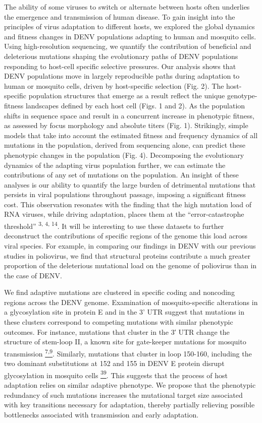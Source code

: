 \documentclass[
]{article}
\begin{document}
The ability of some viruses to switch or alternate between hosts often
underlies the emergence and transmission of human disease. To gain
insight into the principles of virus adaptation to different hosts, we
explored the global dynamics and fitness changes in DENV populations
adapting to human and mosquito cells. Using high-resolution sequencing,
we quantify the contribution of beneficial and deleterious mutations
shaping the evolutionary paths of DENV populations responding to
host-cell specific selective pressures. Our analysis shows that DENV
populations move in largely reproducible paths during adaptation to
human or mosquito cells, driven by host-specific selection (Fig. 2). The
host-specific population structures that emerge as a result reflect the
unique genotype-fitness landscapes defined by each host cell (Figs. 1
and 2). As the population shifts in sequence space and result in a
concurrent increase in phenotypic fitness, as assessed by focus
morphology and absolute titers (Fig. 1). Strikingly, simple models that
take into account the estimated fitness and frequency dynamics of all
mutations in the population, derived from sequencing alone, can predict
these phenotypic changes in the population (Fig. 4). Decomposing the
evolutionary dynamics of the adapting virus population further, we can
estimate the contributions of any set of mutations on the population. An
insight of these analyses is our ability to quantify the large burden of
detrimental mutations that persists in viral populations throughout
passage, imposing a significant fitness cost. This observation resonates
with the finding that the high mutation load of RNA viruses, while
driving adaptation, places them at the ``error-catastrophe threshold''
\textsuperscript{3, 4, 14}. It will be interesting to use these datasets
to further deconstruct the contributions of specific regions of the
genome this load across viral species. For example, in comparing our
findings in DENV with our previous studies in poliovirus, we find that
structural proteins contribute a much greater proportion of the
deleterious mutational load on the genome of poliovirus than in the case
of DENV.

We find adaptive mutations are clustered in specific coding and
noncoding regions across the DENV genome. Examination of
mosquito-specific alterations in a glycosylation site in protein E and
in the 3' UTR suggest that mutations in these clusters correspond to
competing mutations with similar phenotypic outcomes. For instance,
mutations that cluster in the 3′ UTR change the structure of stem-loop
II, a known site for gate-keeper mutations for mosquito transmission
\href{https://paperpile.com/c/REZjPf/r0H6+mYIl}{\textsuperscript{7,9}}.
Similarly, mutations that cluster in loop 150-160, including the two
dominant substitutions at 152 and 155 in DENV E protein disrupt
glycosylation in mosquito cells
\href{https://paperpile.com/c/REZjPf/hSNe}{\textsuperscript{39}}. This
suggests that the process of host adaptation relies on similar adaptive
phenotype. We propose that the phenotypic redundancy of such mutations
increases the mutational target size associated with key transitions
necessary for adaptation, thereby partially relieving possible
bottlenecks associated with transmission and early adaptation.~
\end{document}
